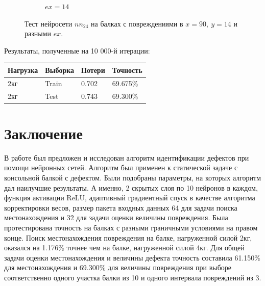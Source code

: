 \documentclass[a4paper,12pt]{article}
\theoremstyle{remark}
\begin{document}
\begin{figure}[h]
\begin{subfigure}{0.33\textwidth}
			\caption{$ex=14$}
		\end{subfigure}
		\caption{Тест нейросети $nn_{24}$ на балках с повреждениями в $x=90,\ y=14$ и разными $ex$.}
		\label{fig:nn3_damage_90_14}
	\end{figure}

	Результаты, полученные на 10 000-й итерации: \\
	
	\begin{tabular}{| l | l | l | l |}
		\hline
		Нагрузка & Выборка & Потери & Точность \\
		\hline
		2кг & Train & 0.702 & 69.675\% \\
		\hline
		2кг & Test & 0.743 & 69.300\% \\
		\hline
	\end{tabular}
	
	\newpage
	\section{Заключение}
	
	
	В работе был предложен и исследован алгоритм идентификации дефектов при помощи нейронных сетей. Алгоритм был применен к статической задаче с консольной балкой с дефектом. Были подобраны параметры, на которых алгоритм дал наилучшие результаты. А именно, 2 скрытых слоя по 10 нейронов в каждом, функция активации ReLU, адаптивный градиентный спуск в качестве алгоритма корректировки весов, размер пакета входных данных 64 для задачи поиска местонахождения и 32 для задачи оценки величины повреждения. Была протестирована точность на балках с разными граничными условиями на правом конце. Поиск местонахождения повреждения на балке, нагруженной силой 2кг, оказался на 1.176\% точнее чем на балке, нагруженной силой 4кг. Для общей задачи оценки местонахождения и величины дефекта точность составила 61.150\% для местонахождения и 69.300\% для величины повреждения при выборе соответственно одного участка балки из 10 и одного интервала повреждений из 3.
	
\end{document}
